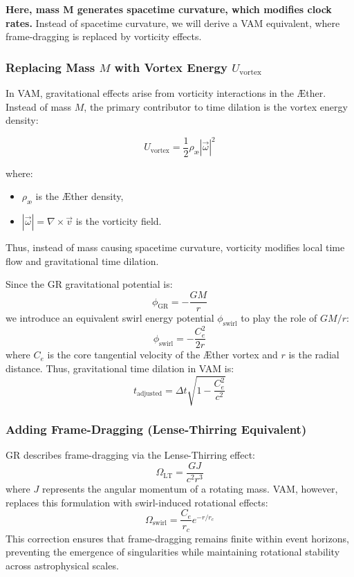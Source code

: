 \textbf{Here, mass M generates spacetime curvature, which modifies clock rates.}
Instead of spacetime curvature, we will derive a VAM equivalent, where frame-dragging is replaced by vorticity effects.

\subsubsection*{Replacing Mass $M$ with Vortex Energy $U_\text{vortex}$}
In VAM, gravitational effects arise from vorticity interactions in the Æther. Instead of mass $M$, the primary contributor to time dilation is the vortex energy density:


\begin{equation*}
    U_\text{vortex} = \frac{1}{2} \rho_\text{\ae} |\vec{\omega}|^2
\end{equation*}

where:
\begin{itemize}
    \item $\rho_\text{\ae}$ is the Æther density,
    \item $|\vec{\omega}| = \nabla \times \vec{v}$ is the vorticity field.
\end{itemize}
Thus, instead of mass causing spacetime curvature, vorticity modifies local time flow and gravitational time dilation.

Since the GR gravitational potential is:
\begin{equation*}
    \phi_\text{GR} = -\frac{GM}{r}
\end{equation*}
we introduce an equivalent swirl energy potential $\phi_\text{swirl}$ to play the role of $GM/r$:
\begin{equation*}
    \phi_\text{swirl} = -\frac{C_e^2}{2r}
\end{equation*}
where $C_e$ is the core tangential velocity of the Æther vortex and $r$ is the radial distance. Thus, gravitational time dilation in VAM is:
\begin{equation*}
    t_\text{adjusted} = \Delta t \sqrt{1 - \frac{C_e^2}{c^2}}
\end{equation*}

\subsubsection*{Adding Frame-Dragging (Lense-Thirring Equivalent)}
GR describes frame-dragging via the Lense-Thirring effect:
\begin{equation*}
    \Omega_\text{LT} = \frac{GJ}{c^2 r^3}
\end{equation*}
where $J$ represents the angular momentum of a rotating mass. VAM, however, replaces this formulation with swirl-induced rotational effects:
\begin{equation*}
    \Omega_\text{swirl} = \frac{C_e}{r_c} e^{-r/r_c}
\end{equation*}
This correction ensures that frame-dragging remains finite within event horizons, preventing the emergence of singularities while maintaining rotational stability across astrophysical scales.

